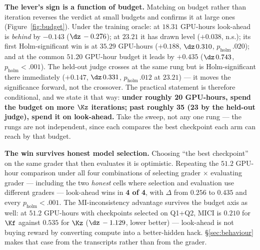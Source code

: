\textbf{The lever's sign is a function of budget.} Matching on budget rather than iteration
reverses the verdict at small budgets and confirms it at large ones (Figure~\ref{fig:budget}).
Under the training oracle: at $18.31$ GPU-hours look-ahead is \emph{behind} by $-0.143$
($\dz\,-0.276$); at $23.21$ it has drawn level ($+0.038$, n.s.); its first Holm-significant win is
at $35.29$ GPU-hours ($+0.188$, $\dz\,0.310$, $p_{\text{holm}}\,.020$); and at the common $51.20$
GPU-hour budget it leads by $+0.435$ ($\dz\,0.743$, $p_{\text{holm}}<.001$). The held-out judge
crosses at the same rung but is Holm-significant there immediately ($+0.147$, $\dz\,0.331$,
$p_{\text{holm}}\,.012$ at $23.21$) --- it moves the significance forward, not the crossover. The
practical statement is therefore conditional, and we state it that way: \textbf{under roughly 20
GPU-hours, spend the budget on more $\Kz$ iterations; past roughly 35 (23 by the held-out judge),
spend it on look-ahead.} Take the sweep, not any one rung --- the rungs are not independent, since
each compares the best checkpoint each arm can reach by that budget.

\textbf{The win survives honest model selection.} Choosing ``the best checkpoint'' on the same
grader that then evaluates it is optimistic. Repeating the $51.2$ GPU-hour comparison under all
four combinations of selecting grader $\times$ evaluating grader --- including the two \emph{honest}
cells where selection and evaluation use different graders --- look-ahead wins in \textbf{4 of 4},
with $\Delta$ from $0.256$ to $0.435$ and every $p_{\text{holm}} < .001$. The MI-inconsistency
advantage survives the budget axis as well: at $51.2$ GPU-hours with checkpoints selected on Q1+Q2,
MICI is $0.210$ for $\Kf$ against $0.535$ for $\Kz$ ($\dz\,-1.129$, lower better) --- look-ahead is
not buying reward by converting compute into a better-hidden hack. \S\ref{sec:behaviour} makes that
case from the transcripts rather than from the grader.
